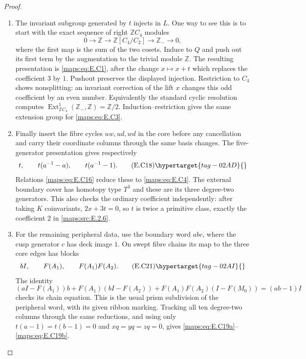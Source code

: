 \begin{proof}
\begin{enumerate}[label={$\langle1\rangle$\arabic*.},leftmargin=*]
\item The invariant subgroup generated by $t$ injects in
$L$. One way to see this is to start with the exact
sequence of right $\mathbb ZC_4$ modules
\[
 0\longrightarrow\mathbb Z\longrightarrow
 \mathbb Z[C_4/C_2]\longrightarrow\mathbb Z_-\longrightarrow0,
\]
where the first map is the sum of the two cosets.
Induce to $Q$ and push out its first term by the
augmentation to the trivial module $\mathbb Z$.
The resulting presentation is \eqref{maps:eq:E.C1}, after the
change $x\mapsto x+t$ which replaces the coefficient
$3$ by $1$. Pushout preserves the displayed injection.
Restriction to $C_4$ shows nonsplitting: an invariant
correction of the lift $x$ changes this odd coefficient
by an even number. Equivalently the standard cyclic
resolution computes
$\operatorname{Ext}^1_{\mathbb ZC_4}(\mathbb Z_-,\mathbb Z)
=\mathbb Z/2$. Induction--restriction gives the same
extension group for \eqref{maps:eq:E.C3}.

\item Finally insert the fibre cycles $uw,ud,wd$ in
the core before any cancellation and carry their
coordinate columns through the same basis changes.
The five-generator presentation gives respectively
\[
 t,\qquad t(a^{-1}-a),\qquad t(a^{-1}-1).
 \tag{E.C18}\hypertarget{tag-02AD}{}\label{maps:eq:E.C18}
\]
Relations \eqref{maps:eq:E.C16} reduce these to \eqref{maps:eq:E.C4}. The external
boundary cover has homotopy type $T^3$ and these are
its three degree-two generators. This also checks
the ordinary coefficient independently: after taking
$K$ coinvariants, $2x+3t=0$, so $t$ is twice a
primitive class, exactly the coefficient $2$ in \ref{maps:src:E.2.6}.

\item For the remaining peripheral data, use the
boundary word $abc$, where the cusp generator $c$
has deck image $1$. On swept fibre chains its map to
the three core edges has blocks
\[
                 bI,\qquad F(A_1),\qquad F(A_1)F(A_2).
 \tag{E.C21}\hypertarget{tag-02AI}{}\label{maps:eq:E.C21}
\]
The identity
\[
 (aI-F(A_1))b+F(A_1)(bI-F(A_2))
       +F(A_1)F(A_2)(I-F(M_0))=(ab-1)I
\]
checks its chain equation. This is the usual prism
subdivision of the peripheral word, with
its given ribbon marking. Tracking all ten
degree-two columns through the same reductions,
and using only $t(a-1)=t(b-1)=0$ and
$xq=yq=zq=0$, gives \eqref{maps:eq:E.C19a}--\eqref{maps:eq:E.C19b}.

\end{enumerate}
\end{proof}


